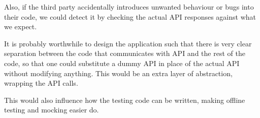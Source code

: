Also, if the third party accidentally introduces unwanted behaviour or bugs
into their code, we could detect it by checking the actual API responses
against what we expect.

It is probably worthwhile to design the application such that there is very
clear separation between the code that communicates with API and the rest of
the code, so that one could substitute a dummy API in place of the actual API
without modifying anything. This would be an extra layer of abstraction,
wrapping the API calls.

This would also influence how the testing code can be written, making offline
testing and mocking easier do.

